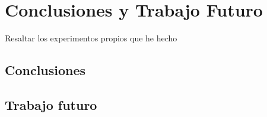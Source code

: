 \chapter{Conclusiones y Trabajo Futuro} \label{Capítulo 5}

Resaltar los experimentos propios que he hecho

\section{Conclusiones} \label{Subsec: 5_1}



\section{Trabajo futuro} \label{Subsec: 5_2}